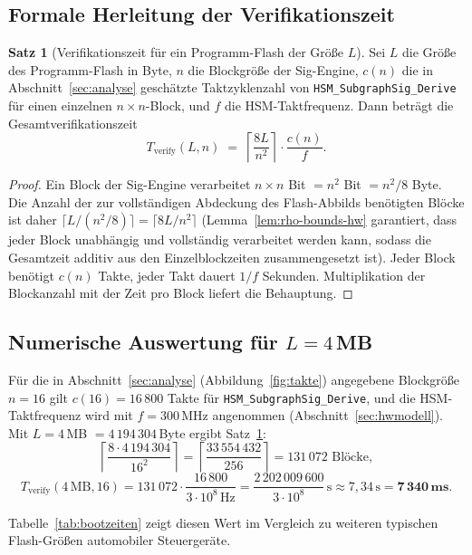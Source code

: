 ﻿\documentclass[a4paper,12pt]{article}
\theoremstyle{definition}
\newtheorem{satz}{Satz}
\begin{document}
\subsection{Formale Herleitung der Verifikationszeit}

\begin{satz}[Verifikationszeit für ein Programm-Flash der Größe $L$]
	\label{satz:bootzeit}
	Sei $L$ die Größe des Programm-Flash in Byte, $n$ die Blockgröße der Sig-Engine, $c(n)$ die in Abschnitt~\ref{sec:analyse} geschätzte Taktzyklenzahl von \texttt{HSM\_SubgraphSig\_Derive} für einen einzelnen $n \times n$-Block, und $f$ die HSM-Taktfrequenz. Dann beträgt die Gesamtverifikationszeit
	\[
	T_{\mathrm{verify}}(L,n) \;=\; \left\lceil \frac{8L}{n^2} \right\rceil \cdot \frac{c(n)}{f}.
	\]
\end{satz}

\begin{proof}
	Ein Block der Sig-Engine verarbeitet $n \times n$ Bit $= n^2$ Bit $= n^2/8$ Byte. Die Anzahl der zur vollständigen Abdeckung des Flash-Abbilds benötigten Blöcke ist daher $\lceil L / (n^2/8) \rceil = \lceil 8L/n^2 \rceil$ (Lemma~\ref{lem:rho-bounds-hw} garantiert, dass jeder Block unabhängig und vollständig verarbeitet werden kann, sodass die Gesamtzeit additiv aus den Einzelblockzeiten zusammengesetzt ist). Jeder Block benötigt $c(n)$ Takte, jeder Takt dauert $1/f$ Sekunden. Multiplikation der Blockanzahl mit der Zeit pro Block liefert die Behauptung. \qedhere
\end{proof}

\subsection{Numerische Auswertung für $L = 4$\,MB}

Für die in Abschnitt~\ref{sec:analyse} (Abbildung~\ref{fig:takte}) angegebene Blockgröße $n=16$ gilt $c(16) = 16\,800$ Takte für \texttt{HSM\_SubgraphSig\_Derive}, und die HSM-Taktfrequenz wird mit $f = 300$\,MHz angenommen (Abschnitt~\ref{sec:hwmodell}). Mit $L = 4$\,MB $= 4\,194\,304$\,Byte ergibt Satz~\ref{satz:bootzeit}:
\[
\left\lceil \frac{8 \cdot 4\,194\,304}{16^2} \right\rceil = \left\lceil \frac{33\,554\,432}{256} \right\rceil = 131\,072 \text{ Blöcke},
\]
\[
T_{\mathrm{verify}}(4\,\mathrm{MB}, 16) = 131\,072 \cdot \frac{16\,800}{3\cdot 10^8\,\mathrm{Hz}} = \frac{2\,202\,009\,600}{3\cdot 10^8}\,\mathrm{s} \approx 7{,}34\,\mathrm{s} = \mathbf{7\,340\,ms}.
\]

Tabelle~\ref{tab:bootzeiten} zeigt diesen Wert im Vergleich zu weiteren typischen Flash-Größen automobiler Steuergeräte.
\end{document}
